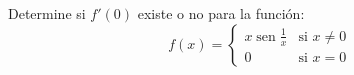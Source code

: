 \item Determine si $f'(0)$ existe o no para la función:
$$f(x) = \begin{cases} 
x \operatorname{sen} \frac{1}{x} & \text{si } x \ne 0 \\ 
0 & \text{si } x = 0 
\end{cases}$$
